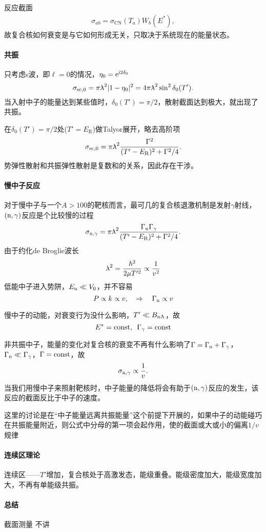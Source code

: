 反应截面
\begin{align}
	\sigma_{ab}=\sigma_{\mathrm{CN}}(T_a)W_b(E^\ast),
\end{align}
故复合核如何衰变是与它如何形成无关，只取决于系统现在的能量状态。
\paragraph{共振}只考虑s波，即$\ell=0$的情况，$\eta_0=\mathop{}\!\mathrm{e}^{\mathrm{i}2\delta_0}$
\[
	\sigma_{\mathrm{sc},0}=\pi\lambdabar^2|1-\eta_0|^2=4\pi\lambdabar^2\sin^2\delta_0(T').
\]
当入射中子的能量达到某些值时，$\delta_0(T')=\pi/2$，散射截面达到极大，就出现了共振。

在$\delta_0(T')=\pi/2$处($T'=E_\mathrm R$)做Talyor展开，略去高阶项
\[
	\sigma_{\mathrm{sc},0}=\pi{^{_-}\!\!\!\!\lambda}^2\frac{\Gamma^2}{(T'-E_\mathrm R)^2+\Gamma^2/4}.
\]
势弹性散射和共振弹性散射是复数和的关系，因此存在干涉。
\paragraph{慢中子反应}对于慢中子与一个$A>100$的靶核而言，最可几的复合核退激机制是发射$\gamma$射线，$(\mathrm n,\gamma)$反应是个比较慢的过程
\[
	\sigma_{\mathrm n,\gamma}=\pi{^{_-}\!\!\!\!\lambda}^2\frac{\Gamma_\mathrm n\Gamma_\gamma}{(T'-E_\mathrm R)^2+\Gamma^2/4}.
\]
由于约化de Broglie波长
\[
	{^{_-}\!\!\!\!\lambda}^2=\frac{\hbar^2}{2\mu T'^2}\propto\frac1{v^2}
\]
低能中子进入势阱，$E_\mathrm n\ll V_0$，并不容易
\[
	P\propto k\propto v,\quad\Rightarrow\quad\Gamma_\mathrm n\propto v
\]

慢中子的动能，对衰变行为没什么影响，$T'\ll B_{\mathrm n\mathrm{A}}$，故
\[
	E^\ast=\mathrm{const},\enspace\Gamma_\gamma=\mathrm{const}
\]

非共振中子，能量的变化对复合核的衰变不再有什么影响了$\Gamma=\Gamma_\mathrm n+\Gamma_\gamma$，$\Gamma_\mathrm n\ll\Gamma_\gamma$，$\Gamma=\mathrm{const}$，故
\begin{align}\label{slow-neutron}
	\sigma_{\mathrm n,\gamma}\propto\frac1v.
\end{align}
当我们用慢中子来照射靶核时，中子能量的降低将会有助于$(\mathrm n,\gamma)$反应的发生，该反应的截面反比于中子的速度。

这里的讨论是在“中子能量远离共振能量”这个前提下开展的，如果中子的动能碰巧在共振能量附近，则公式中分母的第一项会起作用，使的截面或大或小的偏离$1/v$规律
\paragraph{连续区理论}连续区——$T'$增加，复合核处于高激发态，能级重叠。能级密度加大，能级宽度加大，不再有单能级共振。
\paragraph{总结}截面测量
\clearpage
{}
不讲
\clearpage
